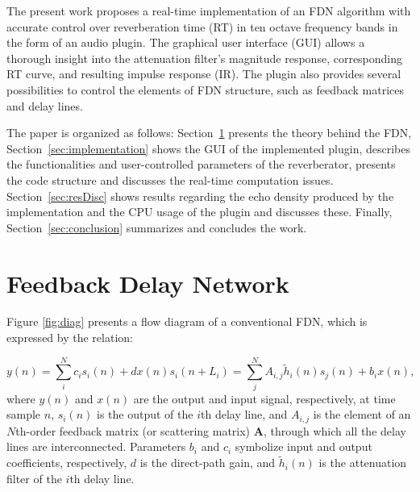 \documentclass[twoside,a4paper]{article}
\newcommand{\silvin}[1]{\textcolor{ForestGreen}{#1}}
\begin{document}




The present work proposes a real-time implementation of an FDN algorithm with accurate control over reverberation time (RT) in ten octave frequency bands in the form of an audio plugin. The graphical user interface (GUI) allows a thorough insight into the attenuation filter's magnitude response, corresponding RT curve, and resulting impulse response (IR). The plugin also provides several possibilities to control the elements of FDN structure, such as feedback matrices and delay lines.%

The paper is organized as follows: Section~\ref{sec:FDN} presents the theory behind the FDN, Section~\ref{sec:implementation} shows the GUI of the implemented plugin, describes the functionalities and user-controlled parameters of the reverberator, presents the code structure and discusses the real-time computation issues. Section~\ref{sec:resDisc} shows results regarding the echo density produced by the implementation and the CPU usage of the plugin and discusses these. Finally, Section~\ref{sec:conclusion} summarizes and concludes the work.

\section{Feedback Delay Network}\label{sec:FDN}
Figure \ref{fig:diag} presents a flow diagram of a conventional FDN, which is expressed by the relation:

\begin{subequations} \label{1}
\begin{equation}\label{1a}
y(n) =  \sum_i^N c_i s_i(n) + d x(n) 
\end{equation}
\begin{equation}\label{1b}
s_i(n + L_i) = \sum_j^N A_{i,j} \widetilde{h}_{i}(n) s_j(n) + b_i x(n),
\end{equation}
\end{subequations}
%
where $y(n)$ and $x(n)$ are the output and input signal, respectively, at time sample $n$, $s_i(n)$ is the output of the $i$th delay line, and $A_{i,j}$ is the element of an $N$th-order feedback matrix (or scattering matrix) $\textbf{A}$, through which all the delay lines are interconnected. Parameters $b_i$ and $c_i$ symbolize input and output coefficients, respectively, $d$ is the direct-path gain, and $\widetilde{h}_{i}(n)$ is the attenuation filter of the $i$th delay line.
\end{document}
